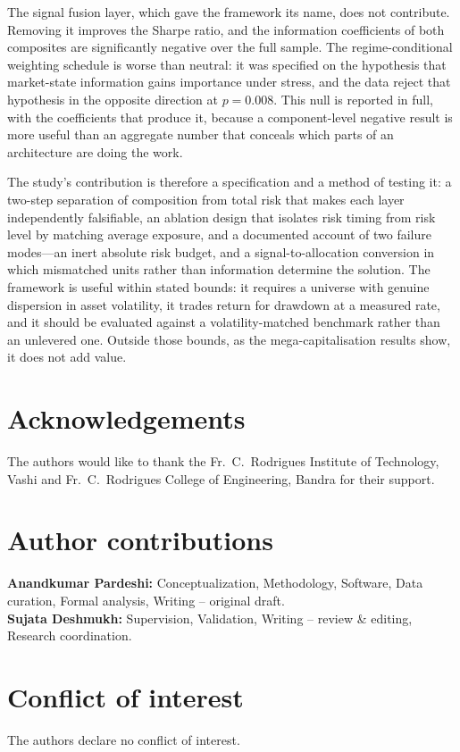 \documentclass{singlecol-new}
\theoremstyle{TH}{
\newtheorem{lemma}{Lemma}
\newtheorem{theorem}[lemma]{Theorem}
\newtheorem{corrolary}[lemma]{Corrolary}
\newtheorem{conjecture}[lemma]{Conjecture}
\newtheorem{proposition}[lemma]{Proposition}
\newtheorem{claim}[lemma]{Claim}
\newtheorem{stheorem}[lemma]{Wrong Theorem}
\newtheorem{algorithm}{Algorithm}
}
\theoremstyle{THrm}{
\newtheorem{definition}{Definition}[section]
\newtheorem{question}{Question}[section]
\newtheorem{remark}{Remark}
\newtheorem{scheme}{Scheme}
}
\theoremstyle{THhit}{
\newtheorem{case}{Case}[section]
}
\begin{document}
The signal fusion layer, which gave the framework its name, does not contribute.
Removing it improves the Sharpe ratio, and the information coefficients of both
composites are significantly negative over the full sample. The regime-conditional
weighting schedule is worse than neutral: it was specified on the hypothesis that
market-state information gains importance under stress, and the data reject that
hypothesis in the opposite direction at $p = 0.008$. This null is reported in full,
with the coefficients that produce it, because a component-level negative result is more
useful than an aggregate number that conceals which parts of an architecture are doing
the work.

The study's contribution is therefore a specification and a method of testing it: a
two-step separation of composition from total risk that makes each layer independently
falsifiable, an ablation design that isolates risk timing from risk level by matching
average exposure, and a documented account of two failure modes---an inert absolute risk
budget, and a signal-to-allocation conversion in which mismatched units rather than
information determine the solution. The framework is useful within stated bounds: it
requires a universe with genuine dispersion in asset volatility, it trades return for
drawdown at a measured rate, and it should be evaluated against a volatility-matched
benchmark rather than an unlevered one. Outside those bounds, as the mega-capitalisation
results show, it does not add value.


\section*{Acknowledgements}
\label{sec:declarations}
The authors would like to thank the Fr.~C.~Rodrigues Institute of Technology, Vashi and
Fr.~C.~Rodrigues College of Engineering, Bandra for their support.

\section*{Author contributions}
\textbf{Anandkumar Pardeshi:} Conceptualization, Methodology, Software, Data curation,
Formal analysis, Writing -- original draft.\\
\textbf{Sujata Deshmukh:} Supervision, Validation, Writing -- review \& editing,
Research coordination.

\section*{Conflict of interest}
The authors declare no conflict of interest.
\end{document}
